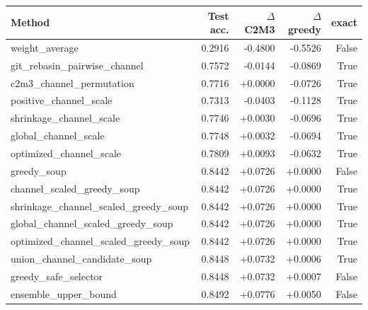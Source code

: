 \begin{tabular}{lrrrr}
\toprule
Method & Test acc. & $\Delta$ C2M3 & $\Delta$ greedy & exact \\
\midrule
weight\_average & 0.2916 & -0.4800 & -0.5526 & False \\
git\_rebasin\_pairwise\_channel & 0.7572 & -0.0144 & -0.0869 & True \\
c2m3\_channel\_permutation & 0.7716 & +0.0000 & -0.0726 & True \\
positive\_channel\_scale & 0.7313 & -0.0403 & -0.1128 & True \\
shrinkage\_channel\_scale & 0.7746 & +0.0030 & -0.0696 & True \\
global\_channel\_scale & 0.7748 & +0.0032 & -0.0694 & True \\
optimized\_channel\_scale & 0.7809 & +0.0093 & -0.0632 & True \\
greedy\_soup & 0.8442 & +0.0726 & +0.0000 & False \\
channel\_scaled\_greedy\_soup & 0.8442 & +0.0726 & +0.0000 & True \\
shrinkage\_channel\_scaled\_greedy\_soup & 0.8442 & +0.0726 & +0.0000 & True \\
global\_channel\_scaled\_greedy\_soup & 0.8442 & +0.0726 & +0.0000 & True \\
optimized\_channel\_scaled\_greedy\_soup & 0.8442 & +0.0726 & +0.0000 & True \\
union\_channel\_candidate\_soup & 0.8448 & +0.0732 & +0.0006 & True \\
greedy\_safe\_selector & 0.8448 & +0.0732 & +0.0007 & False \\
ensemble\_upper\_bound & 0.8492 & +0.0776 & +0.0050 & False \\
\bottomrule
\end{tabular}
